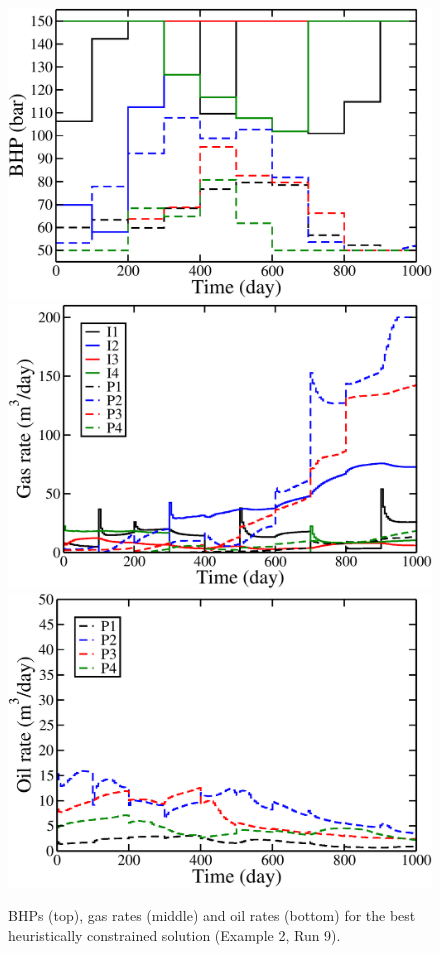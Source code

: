 \begin{figure}
\begin{center}
\includegraphics[totalheight=2.2in,angle=0]{figures/spe10topLayerOptimalChoppedIuPu_BHP.pdf}
\includegraphics[totalheight=2.17in,angle=0]{figures/spe10topLayerOptimalChoppedIuPu_rate_gas.pdf}
\includegraphics[totalheight=2.2in,angle=0]{figures/spe10topLayerOptimalChoppedIuPu_rate_oil.pdf}
\end{center}
\caption{BHPs (top), gas rates (middle) and oil rates
  (bottom) for the best heuristically constrained solution (Example 2, Run 9).}
\label{fig:SPE10TopLayerUnconstrainedOptimalChoppedRates}
\end{figure}
